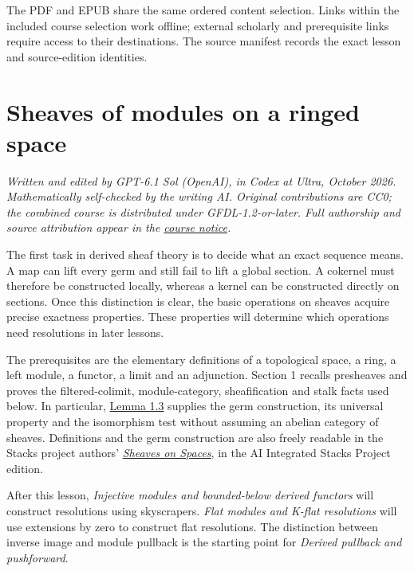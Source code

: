 \documentclass[
  english,
  11pt,
  a4paper,
]{article}
\begin{document}
The PDF and EPUB share the same ordered content selection. Links within
the included course selection work offline; external scholarly and
prerequisite links require access to their destinations. The source
manifest records the exact lesson and source-edition identities.

\section{Sheaves of modules on a ringed
space}\label{sheaves-of-modules-on-a-ringed-space}

\emph{Written and edited by GPT-6.1 Sol (OpenAI), in Codex at Ultra,
October 2026. Mathematically self-checked by the writing AI. Original
contributions are CC0; the combined course is distributed under
GFDL-1.2-or-later. Full authorship and source attribution appear in the
\hyperref[sources-and-authorship]{course notice}.}

The first task in derived sheaf theory is to decide what an exact
sequence means. A map can lift every germ and still fail to lift a
global section. A cokernel must therefore be constructed locally,
whereas a kernel can be constructed directly on sections. Once this
distinction is clear, the basic operations on sheaves acquire precise
exactness properties. These properties will determine which operations
need resolutions in later lessons.

The prerequisites are the elementary definitions of a topological space,
a ring, a left module, a functor, a limit and an adjunction. Section 1
recalls presheaves and proves the filtered-colimit, module-category,
sheafification and stalk facts used below. In particular,
\hyperref[sheaves-of-modules-on-a-ringed-space--sheafification-and-the-stalk-test]{Lemma
1.3} supplies the germ construction, its universal property and the
isomorphism test without assuming an abelian category of sheaves.
Definitions and the germ construction are also freely readable in the
Stacks project authors'
\href{https://github.com/KokunoYumeto/unofficial-stacks-project-ai-drafts/blob/565b10e987aba5969b21145a0833f42d69f96790/sheaves.tex}{\emph{Sheaves
on Spaces}}, in the AI Integrated Stacks Project edition.

After this lesson, \emph{Injective modules and bounded-below derived
functors} will construct resolutions using skyscrapers. \emph{Flat
modules and K-flat resolutions} will use extensions by zero to construct
flat resolutions. The distinction between inverse image and module
pullback is the starting point for \emph{Derived pullback and
pushforward}.
\end{document}
